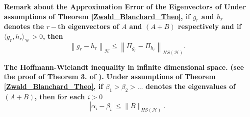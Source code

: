 \documentclass[twoside,11pt]{article}
\newcommand{\Hk}{\mathcal{H}}
\newcommand{\HSk}{HS(\mathcal{H})}
\begin{document}
\begin{proposition}
	\bf{Remark about the Approximation Error of the Eigenvectors of \cite{zwald2005convergence} \rm}
	\normalfont
Under assumptions of Theorem \ref{Zwald_Blanchard_Theo}, if $g_r$ and $h_r$ denotes the $r-$th eigenvectors of $A$ and $(A+B)$ respectively and if $\langle g_r, h_r \rangle_{\Hk} >0$, then 
$$ \left \| g_r - h_r \right \|_{\Hk} \leq \left \| \Pi_{g_r} - \Pi_{h_r} \right \|_{\HSk}. $$
\label{Zwald_Blanchard_Prop}
\end{proposition}
\begin{proposition}
	\bf{The Hoffmann-Wielandt inequality \cite{bhatia1994hoffman} in infinite dimensional space.\rm}
	\normalfont
	(see the proof of Theorem 3. of \cite{zwald2005convergence}). 
\label{Hoffmann_inequality}
Under assumptions of Theorem \ref{Zwald_Blanchard_Theo}, if  $\beta_1 > \beta_2 > \ldots$ denotes the eigenvalues of $(A+B)$, then for each $i >0$ 
\begin{equation*}
	|\alpha_i-\beta_i| \leq  \|B\|_{\HSk}.
\end{equation*}
\end{proposition}

\newpage
\end{document}
